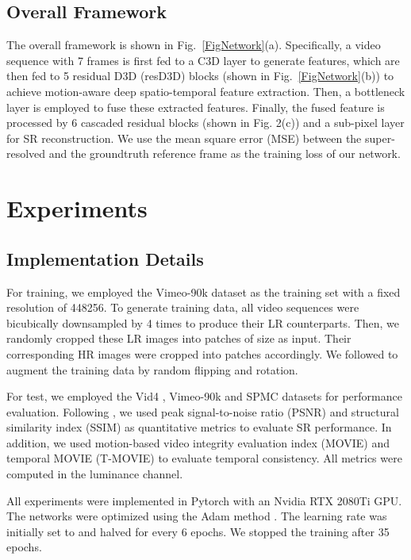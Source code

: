 \documentclass[journal]{IEEEtran}
\begin{document}
\subsection{Overall Framework}\label{SecD3D}

The overall framework is shown in Fig.~\ref{FigNetwork}(a). Specifically, a video sequence with 7 frames is first fed to a C3D layer to generate features, which are then fed to 5 residual D3D (resD3D) blocks (shown in Fig.~\ref{FigNetwork}(b)) to achieve motion-aware deep spatio-temporal feature extraction. Then, a bottleneck layer is employed to fuse these extracted features. Finally, the fused feature is processed by 6 cascaded residual blocks (shown in Fig. 2(c)) and a sub-pixel layer for SR reconstruction. We use the mean square error (MSE) between the super-resolved and the groundtruth reference frame as the training loss of our network.

\section{Experiments}\label{sec4}

\subsection{Implementation Details}

For training, we employed the Vimeo-90k dataset \cite{Vimeo} as the training set with a fixed resolution of 448256. To generate training data, all video sequences were bicubically downsampled by 4 times to produce their LR counterparts. Then, we randomly cropped these LR images into patches of size  as input. Their corresponding HR images were cropped into patches accordingly. We followed \cite{SOFVSR20,SOFVSR18} to augment the training data by random flipping and rotation.

For test, we employed the Vid4 \cite{VESPCN}, Vimeo-90k \cite{Vimeo} and SPMC \cite{DRVSR} datasets for performance evaluation. Following \cite{TDAN,PASSRnet,LF-InterNet}, we used peak signal-to-noise ratio (PSNR) and structural similarity index (SSIM) as quantitative metrics to evaluate SR performance. In addition, we used motion-based video integrity evaluation index (MOVIE) and temporal MOVIE (T-MOVIE) \cite{MOVIE} to evaluate temporal consistency. All metrics were computed in the luminance channel.

 All experiments were implemented in Pytorch with an Nvidia RTX 2080Ti GPU. The networks were optimized using the Adam method \cite{Adam}. The learning rate was initially set to  and halved for every 6 epochs. We stopped the training after 35 epochs.
\end{document}
